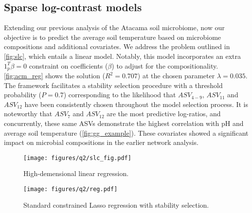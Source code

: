 \documentclass[10pt,a4paper]{article}
\begin{document}
\newpage

\subsection*{Sparse log-contrast models}



\par Extending our previous analysis of the Atacama soil microbiome, now our objective is to predict the average soil temperature based on microbiome compositions and additional covariates. We address the problem outlined in \autoref{fig:slc}, which entails a linear model. Notably, this model incorporates an extra $1^T_p \beta = 0$ constraint on coefficients ($\beta$) to adjust for the compositionality. \autoref{fig:acm_reg} shows the solution ($R^2=0.707$) at the chosen parameter $\lambda=0.035$. The framework facilitates a stability selection procedure with a threshold probability ($P=0.7$) corresponding to the likelihood that $ASV_{4-9}$, $ASV_{11}$ and $ASV_{12}$ have been consistently chosen throughout the model selection process. It is noteworthy that $ASV_{7}$ and $ASV_{12}$ are the most predictive log-ratios, and concurrently, these same ASVs demonstrate the highest correlation with pH and average soil temperature (\autoref{fig:gg_example}). These covariates showed a significant impact on microbial compositions in the earlier network analysis.



\begin{figure}[!h]
    \centering
    \texttt{[image: figures/q2/slc\_fig.pdf]}
    \caption{High-demensional linear regression.}
    \label{fig:slc}
\end{figure}

\begin{figure}[h]
    \centering
    \texttt{[image: figures/q2/reg.pdf]}
    \caption{Standard constrained Lasso regression with stability selection.}
    \label{fig:acm_reg}
\end{figure}
\end{document}
